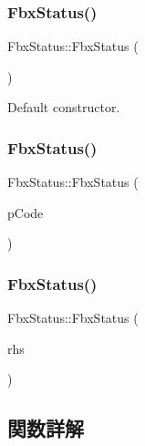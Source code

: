 \subsubsection{\texorpdfstring{Fbx\+Status()}{FbxStatus()}\hspace{0.1cm}{\footnotesize\ttfamily [1/3]}}
{\footnotesize\ttfamily Fbx\+Status\+::\+Fbx\+Status (\begin{DoxyParamCaption}{ }\end{DoxyParamCaption})}



Default constructor. 

\mbox{\label{class_fbx_status_aec4436e434f39c73dd3e4dfb784c14b0}} 
\subsubsection{\texorpdfstring{Fbx\+Status()}{FbxStatus()}\hspace{0.1cm}{\footnotesize\ttfamily [2/3]}}
{\footnotesize\ttfamily Fbx\+Status\+::\+Fbx\+Status (\begin{DoxyParamCaption}\item[{\hyperlink{class_fbx_status_a6a631d5d95b28e31a19aabd5f5809ecc}{E\+Status\+Code}}]{p\+Code }\end{DoxyParamCaption})}

\mbox{\label{class_fbx_status_a6e535b54d854836d79e5a0d4ccac3fd7}} 
\subsubsection{\texorpdfstring{Fbx\+Status()}{FbxStatus()}\hspace{0.1cm}{\footnotesize\ttfamily [3/3]}}
{\footnotesize\ttfamily Fbx\+Status\+::\+Fbx\+Status (\begin{DoxyParamCaption}\item[{const \hyperlink{class_fbx_status}{Fbx\+Status} \&}]{rhs }\end{DoxyParamCaption})}



\subsection{関数詳解}
\mbox{\label{class_fbx_status_ae99f70d26d755bb65af9593cf515a4ed}} 

